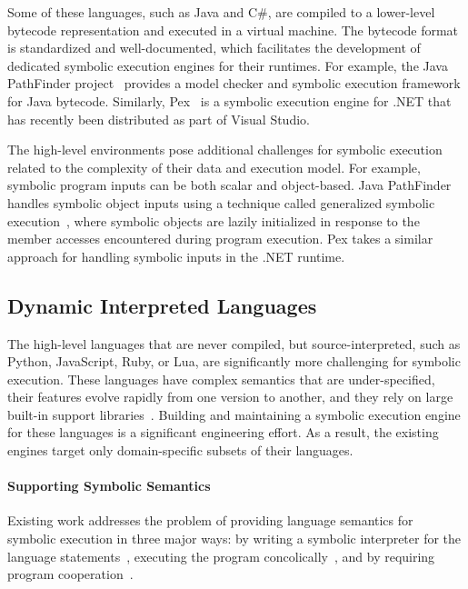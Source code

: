 Some of these languages, such as Java and C\#, are compiled to a lower-level bytecode representation and executed in a virtual machine.
%
The bytecode format is standardized and well-documented, which facilitates the development of dedicated symbolic execution engines for their runtimes.
%
For example, the Java PathFinder project~\cite{visser-jpf,jpf-symbex,jpf-testgen} provides a model checker and symbolic execution framework for Java bytecode.
%
Similarly, Pex~\cite{tillmann-pex} is a symbolic execution engine for .NET that has recently been distributed as part of Visual Studio.

The high-level environments pose additional challenges for symbolic execution related to the complexity of their data and execution model.  For example, symbolic program inputs can be both scalar and object-based.
%
Java PathFinder handles symbolic object inputs using a technique called generalized symbolic execution~\cite{generalized-symbex}, where symbolic objects are lazily initialized in response to the member accesses encountered during program execution.  Pex takes a similar approach for handling symbolic inputs in the .NET runtime.

\subsection{Dynamic Interpreted Languages}

The high-level languages that are never compiled, but source-interpreted, such as Python, JavaScript, Ruby, or Lua, are significantly more challenging for symbolic execution.
%
These languages have complex semantics that are under-specified, their features evolve rapidly from one version to another, and they rely on large built-in support libraries~\cite{dom2011,cutie-py,pythonReference}.
%
Building and maintaining a symbolic execution engine for these languages is a significant engineering effort.  As a result, the existing engines target only domain-specific subsets of their languages.

\paragraph{Supporting Symbolic Semantics}

Existing work addresses the problem of providing language semantics for symbolic execution in three major ways: by writing a symbolic interpreter for the language statements~\cite{nice}, executing the program concolically~\cite{cutie-py,jalangi}, and by requiring program cooperation~\cite{commuter}.

